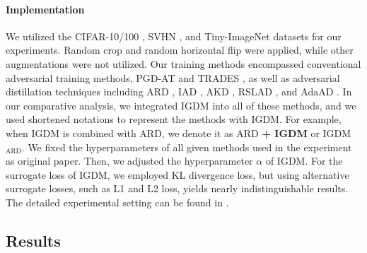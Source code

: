 \documentclass{article} %
\begin{document}
\paragraph{Implementation}
We utilized the CIFAR-10/100 \citep{krizhevsky2009learning}, SVHN \citep{svhn}, and Tiny-ImageNet \citep{le2015tiny} datasets for our experiments.
Random crop and random horizontal flip were applied, while other augmentations were not utilized.
Our training methods encompassed conventional adversarial training methods, PGD-AT \citep{PGD} and TRADES \citep{TRADES}, as well as adversarial distillation techniques including ARD \citep{ard}, IAD \citep{iad}, AKD \citep{akd}, RSLAD \citep{rslad}, and AdaAD \citep{adaad}.
In our comparative analysis, we integrated IGDM into all of these methods, and we used shortened notations to represent the methods with IGDM. 
For example, when IGDM is combined with ARD, we denote it as ARD \textbf{+ IGDM} or IGDM$_{\text{ARD}}$.
We fixed the hyperparameters of all given methods used in the experiment as original paper.
Then, we adjusted the hyperparameter $\alpha$ of IGDM.
For the surrogate loss of IGDM, we employed KL divergence loss, but using alternative surrogate losses, such as L1 and L2 loss, yields nearly indistinguishable results.
The detailed experimental setting can be found in .










































\subsection{Results}
\end{document}
